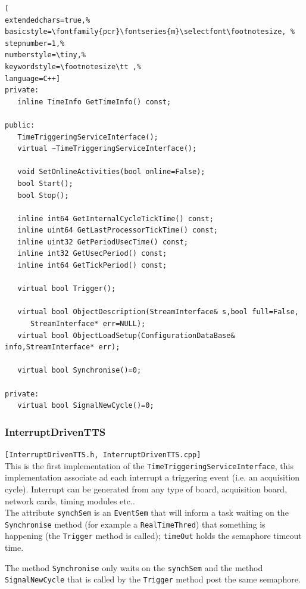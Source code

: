 \begin{lstlisting}[
extendedchars=true,%
basicstyle=\fontfamily{pcr}\fontseries{m}\selectfont\footnotesize, %
stepnumber=1,%
numberstyle=\tiny,%
keywordstyle=\footnotesize\tt ,%
language=C++]
private:
   inline TimeInfo GetTimeInfo() const;

public:
   TimeTriggeringServiceInterface();
   virtual ~TimeTriggeringServiceInterface();

   void SetOnlineActivities(bool online=False);
   bool Start();
   bool Stop();

   inline int64 GetInternalCycleTickTime() const;
   inline uint64 GetLastProcessorTickTime() const;
   inline uint32 GetPeriodUsecTime() const;
   inline int32 GetUsecPeriod() const;
   inline int64 GetTickPeriod() const;

   virtual bool Trigger();

   virtual bool ObjectDescription(StreamInterface& s,bool full=False,
      StreamInterface* err=NULL);
   virtual bool ObjectLoadSetup(ConfigurationDataBase& info,StreamInterface* err);

   virtual bool Synchronise()=0;

private:
   virtual bool SignalNewCycle()=0;
\end{lstlisting}



\subsubsection{InterruptDrivenTTS}
\texttt{[InterruptDrivenTTS.h, InterruptDrivenTTS.cpp]} \\
This is the first implementation of the \texttt{TimeTriggeringServiceInterface}, this implementation associate ad each interrupt a triggering event (i.e. an acquisition cycle). Interrupt can be generated from any type of board, acquisition board, network cards, timing modules etc.. \\


The attribute \texttt{synchSem} is an \texttt{EventSem} that will inform a task waiting on the \texttt{Synchronise} method (for example a \texttt{RealTimeThred}) that something is happening (the \texttt{Trigger} method is called); \texttt{timeOut} holds the semaphore timeout time.

The method \texttt{Synchronise} only waits on the \texttt{synchSem} and the method \texttt{SignalNewCycle} that is called by the \texttt{Trigger} method post the same semaphore.

